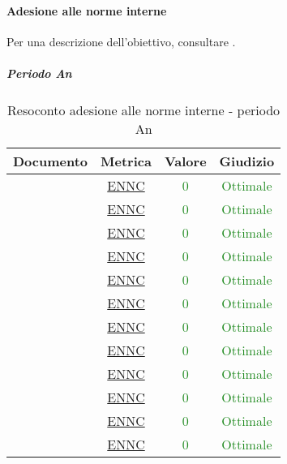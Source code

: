 						\newpage
					\paragraph{Adesione alle norme interne}
						Per una descrizione dell'obiettivo, consultare .
					
						\subparagraph{Periodo An}
							\begin{table}[H]
								\centering
								\small
								\begin{tabular}{c | c | c | c}
									\hline
									\textbf{Documento} & \textbf{Metrica} & \textbf{Valore} & \textbf{Giudizio} \\
									\hline
									\pdpvuno & \hyperref[MAANI]{ENNC} & \textcolor{ForestGreen}{0} & \textcolor{ForestGreen}{Ottimale} \\
									\pdqvuno & \hyperref[MAANI]{ENNC} & \textcolor{ForestGreen}{0} & \textcolor{ForestGreen}{Ottimale}\\
									\ndpvuno & \hyperref[MAANI]{ENNC} &\textcolor{ForestGreen}{0} & \textcolor{ForestGreen}{Ottimale}\\
									\sdfv & \hyperref[MAANI]{ENNC} & \textcolor{ForestGreen}{0} & \textcolor{ForestGreen}{Ottimale}\\
									\adrvuno & \hyperref[MAANI]{ENNC} & \textcolor{ForestGreen}{0} & \textcolor{ForestGreen}{Ottimale}\\
									\glvuno  & \hyperref[MAANI]{ENNC} & \textcolor{ForestGreen}{0} & \textcolor{ForestGreen}{Ottimale}\\
									\vunoi& \hyperref[MAANI]{ENNC} & \textcolor{ForestGreen}{0} & \textcolor{ForestGreen}{Ottimale}\\
									\vduei& \hyperref[MAANI]{ENNC} & \textcolor{ForestGreen}{0} & \textcolor{ForestGreen}{Ottimale}\\
									\vtrei & \hyperref[MAANI]{ENNC} & \textcolor{ForestGreen}{0} & \textcolor{ForestGreen}{Ottimale}\\
									\vquattroi & \hyperref[MAANI]{ENNC} & \textcolor{ForestGreen}{0} & \textcolor{ForestGreen}{Ottimale}\\
									\vunoe & \hyperref[MAANI]{ENNC} & \textcolor{ForestGreen}{0} & \textcolor{ForestGreen}{Ottimale}\\
									\vduee & \hyperref[MAANI]{ENNC} & \textcolor{ForestGreen}{0} & \textcolor{ForestGreen}{Ottimale}\\
									\hline
								\end{tabular}
								\caption{Resoconto adesione alle norme interne - periodo An}
								\label{tab_resoconto_adesione_alle_norme_interne_PA}
							\end{table}
						
